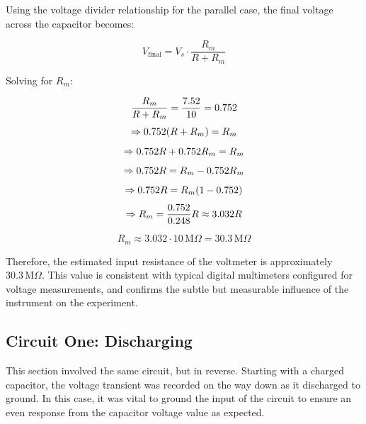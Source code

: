 \documentclass[12pt]{article}
\begin{document}
Using the voltage divider relationship for the parallel case, the final voltage
across the capacitor becomes:

\[
	V_{\text{final}} = V_s \cdot \frac{R_m}{R + R_m}
\]


Solving for $R_m$:

\[
	\frac{R_m}{R + R_m} = \frac{7.52}{10} = 0.752\\
\]
\[
	\Rightarrow 0.752(R + R_m) = R_m\\
\]
\[
	\Rightarrow 0.752R + 0.752R_m = R_m\\
\]
\[
	\Rightarrow 0.752R = R_m - 0.752R_m\\
\]
\[
	\Rightarrow 0.752R = R_m(1 - 0.752)\\
\]
\[
	\Rightarrow R_m = \frac{0.752}{0.248}R \approx 3.032R\\
\]

\[
	R_m \approx 3.032 \cdot 10\,\mathrm{M}\Omega = \boxed{30.3\,\mathrm{M}\Omega}
\]

Therefore, the estimated input resistance of the voltmeter is approximately
$30.3\,\mathrm{M}\Omega$. This value is consistent with typical digital
multimeters configured for voltage measurements, and confirms the subtle but
measurable influence of the instrument on the experiment.
\vspace{1em}

\subsection{Circuit One: Discharging}
This section involved the same circuit, but in reverse. Starting with a charged
capacitor, the voltage transient was recorded on the way down as it discharged
to ground. In this case, it was vital to ground the input of the circuit to
ensure an even response from the capacitor voltage value as expected.
\end{document}
